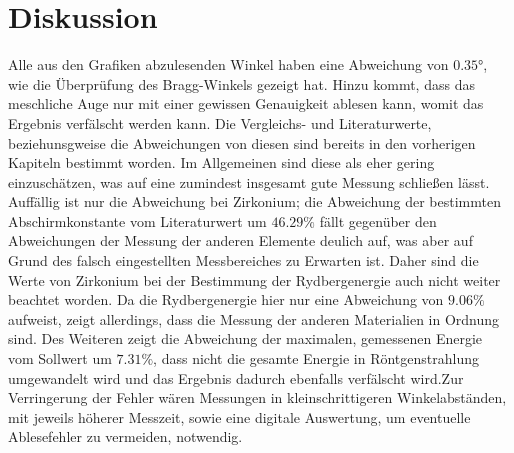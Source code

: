 \section{Diskussion}
\label{sec:Diskussion}
Alle aus den Grafiken abzulesenden Winkel haben eine Abweichung von $0.35°$, wie die Überprüfung des Bragg-Winkels gezeigt hat. Hinzu kommt, dass
das meschliche Auge nur mit einer gewissen Genauigkeit ablesen kann, womit das Ergebnis verfälscht werden kann. Die Vergleichs- und Literaturwerte, beziehunsgweise
die Abweichungen von diesen sind bereits in den vorherigen Kapiteln bestimmt worden. Im Allgemeinen sind diese als eher gering einzuschätzen, 
was auf eine zumindest insgesamt gute Messung schließen lässt. Auffällig ist nur die Abweichung bei Zirkonium; die Abweichung der bestimmten
Abschirmkonstante vom Literaturwert um $46.29 \%$ fällt gegenüber den Abweichungen der Messung der anderen Elemente deulich auf, was aber 
auf Grund des falsch eingestellten Messbereiches zu Erwarten ist. Daher sind die Werte von Zirkonium bei der Bestimmung der Rydbergenergie
auch nicht weiter beachtet worden. Da die Rydbergenergie hier nur eine Abweichung von $9.06 \%$ aufweist, zeigt allerdings, dass die Messung 
der anderen Materialien in Ordnung sind. Des Weiteren zeigt die Abweichung der maximalen, gemessenen Energie vom Sollwert um $7.31 \%$, dass nicht 
die gesamte Energie in Röntgenstrahlung umgewandelt wird und das Ergebnis dadurch ebenfalls verfälscht wird.Zur Verringerung der Fehler wären Messungen in kleinschrittigeren Winkelabständen, mit jeweils höherer Messzeit, sowie eine digitale 
Auswertung, um eventuelle Ablesefehler zu vermeiden, notwendig.